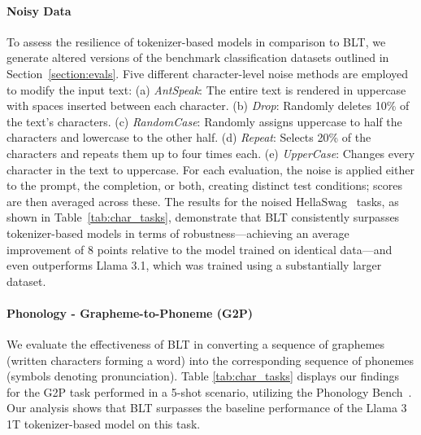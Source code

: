 \paragraph{Noisy Data} To assess the resilience of tokenizer-based models in comparison to {\textsc BLT}, we generate altered versions of the benchmark classification datasets outlined in Section~\ref{section:evals}. Five different character-level noise methods are employed to modify the input text: (a) \textit{AntSpeak}: The entire text is rendered in uppercase with spaces inserted between each character. (b) \textit{Drop}: Randomly deletes 10\% of the text's characters. (c) \textit{RandomCase}: Randomly assigns uppercase to half the characters and lowercase to the other half. (d) \textit{Repeat}: Selects 20\% of the characters and repeats them up to four times each. (e) \textit{UpperCase}: Changes every character in the text to uppercase. For each evaluation, the noise is applied either to the prompt, the completion, or both, creating distinct test conditions; scores are then averaged across these. The results for the noised HellaSwag~\citep{Eval_hellaswag} tasks, as shown in Table~\ref{tab:char_tasks}, demonstrate that {\textsc BLT} consistently surpasses tokenizer-based models in terms of robustness—achieving an average improvement of 8 points relative to the model trained on identical data—and even outperforms Llama 3.1, which was trained using a substantially larger dataset.

\paragraph{Phonology - Grapheme-to-Phoneme (G2P)} We evaluate the effectiveness of {\textsc BLT} in converting a sequence of graphemes (written characters forming a word) into the corresponding sequence of phonemes (symbols denoting pronunciation). Table \ref{tab:char_tasks} displays our findings for the G2P task performed in a 5-shot scenario, utilizing the Phonology Bench~\citep{suvarna2024phonologybench}. Our analysis shows that {\textsc BLT} surpasses the baseline performance of the Llama 3 1T tokenizer-based model on this task.


